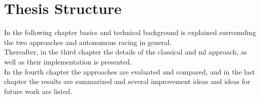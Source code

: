 \section{Thesis Structure}
In the following chapter basics and technical background is explained surrounding the two approaches and autonomous racing in general.\\
Thereafter, in the third chapter the details of the classical and \ac{ml} approach, as well as their implementation is presented.\\
In the fourth chapter the approaches are evaluated and compared,
and in the last chapter the results are summarized and several improvement ideas and ideas for future work are listed.

